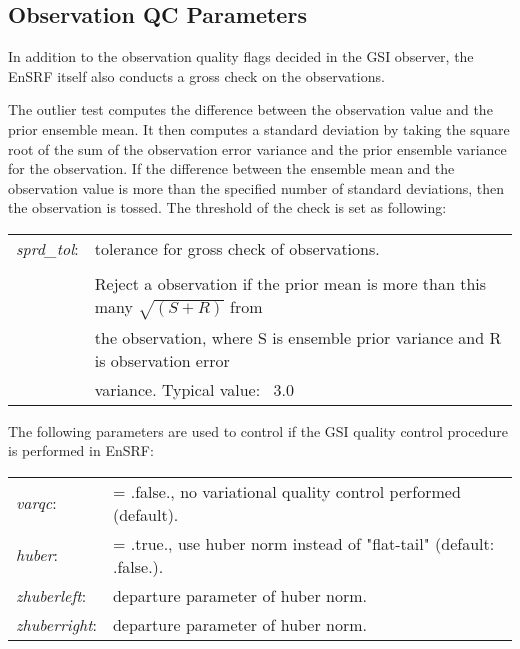 \subsection{Observation QC Parameters}

In addition to the observation quality flags decided in the GSI observer, the EnSRF itself also conducts a gross check on the observations.

The outlier test computes the difference between the observation value and the prior ensemble mean. It then computes a standard deviation by taking the square root of the sum of the observation error variance and the prior ensemble variance for the observation. If the difference between the ensemble mean and the observation value is more than the specified number of standard deviations, then the observation is tossed. The threshold of the check is set as following:
\begin{table}[htbp]
\centering
\begin{tabular}{ll}

\textit{sprd\_tol}: & tolerance for gross check of observations. \\
  &  \\
&  Reject a observation if the prior mean is more than this many $\sqrt{(S+R)}$ from \\
 & the observation, where S is ensemble prior variance and R is observation error\\
 & variance. Typical value: ~3.0  \\   
\end{tabular}
\end{table}

The following parameters are used to control if the GSI quality control procedure is performed in EnSRF:
\begin{table}[htbp]
\centering
\begin{tabular}{ll}

\textit{varqc}: & = .false., no variational quality control performed (default).  \\

\textit{huber}:  & = .true., use huber norm instead of "flat-tail" (default: .false.). \\

\textit{zhuberleft}: & departure parameter of huber norm. \\

\textit{zhuberright}: & departure parameter of huber norm. \\
           
\end{tabular}
\end{table}






  
 
